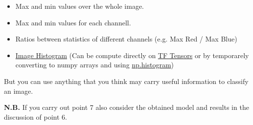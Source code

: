 \documentclass[11pt]{scrartcl}
\begin{document}
\begin{enumerate}
\begin{itemize}
	\item Max and min values over the whole image.
	\item Max and min values for each channell.
	\item Ratios between statistics of different channels (e.g. Max Red / Max Blue)
	\item \href{https://en.wikipedia.org/wiki/Image_histogram}{Image Histogram} (Can be compute directly on \href{https://www.tensorflow.org/api_docs/python/tf/histogram_fixed_width}{TF Tensors} or by temporarely converting to numpy arrays and using \href{https://numpy.org/doc/stable/reference/generated/numpy.histogram.html}{np.histogram})
\end{itemize}
But you can use anything that you think may carry useful information to classify an image.

\textbf{N.B.} If you carry out point 7 also consider the obtained model and results in the discussion of point 6.
\end{enumerate}
\end{document}
